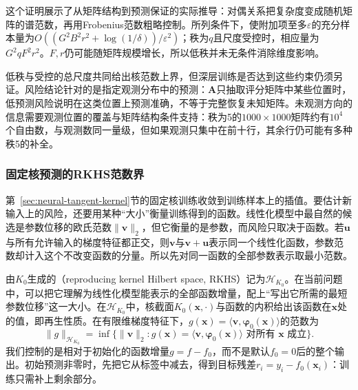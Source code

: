 这个证明展示了从矩阵结构到预测保证的实际推导：对偶关系把复杂度变成随机矩阵的谱范数，再用Frobenius范数粗略控制。所列条件下，使附加项至多$\varepsilon$的充分样本量为$O((G^2B^2r^2+\log(1/\delta))/\varepsilon^2)$；秩为$q$且尺度受控时，相应量为$G^2qF^2r^2$。$F,r$仍可能随矩阵规模增长，所以低秩并未无条件消除维度影响。

低秩与受控的总尺度共同给出核范数上界，但深层训练是否达到这些约束仍须另证。风险结论针对的是指定观测分布中的预测：$\bm A$只抽取评分矩阵中某些位置时，低预测风险说明在这类位置上预测准确，不等于完整恢复未知矩阵。未观测方向的信息需要观测位置的覆盖与矩阵结构条件支持：秩为5的$1000\times1000$矩阵约有$10^4$个自由数，与观测数同一量级，但如果观测只集中在前十行，其余行仍可能有多种秩5的补全。

\subsubsection{固定核预测的RKHS范数界}
\label{sec:ntk-rkhs-generalization}

第~\ref{sec:neural-tangent-kernel}节的固定核训练收敛到训练样本上的插值。要估计新输入上的风险，还要用某种“大小”衡量训练得到的函数。线性化模型中最自然的候选是参数位移的欧氏范数$\|\bm v\|_2$，但它衡量的是参数，而风险只取决于函数。若$\bm u$与所有允许输入的梯度特征都正交，则$\bm v$与$\bm v+\bm u$表示同一个线性化函数，参数范数却计入这个不改变函数的分量。所以先对同一函数的全部参数表示取最小范数。

由$K_0$生成的（reproducing kernel Hilbert space, RKHS）记为$\mathcal H_{K_0}$。在当前问题中，可以把它理解为线性化模型能表示的全部函数增量，配上“写出它所需的最短参数位移”这一大小。在$\mathcal H_{K_0}$中，核截面$K_0(\bm x,\cdot)$与函数的内积给出该函数在$\bm x$处的值，即再生性质。在有限维梯度特征下，$g(\bm x)=\langle\bm v,\bm\varphi_0(\bm x)\rangle$的范数为
\[
 \|g\|_{\mathcal H_{K_0}}
 =\inf\{\|\bm v\|_2:g(\bm x)=\langle\bm v,\bm\varphi_0(\bm x)\rangle
                         \text{ 对所有 }\bm x\text{ 成立}\}.
\]
我们控制的是相对于初始化的函数增量$g=f-f_0$，而不是默认$f_0=0$后的整个输出。初始预测非零时，先把它从标签中减去，得到目标残差$r_i=y_i-f_0(\bm x_i)$：训练只需补上剩余部分。


